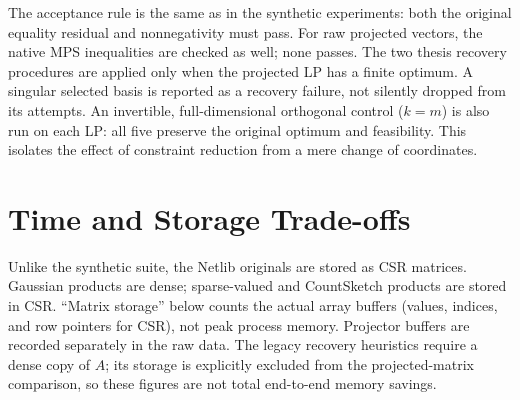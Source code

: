 \documentclass[12pt,letterpaper,oneside]{report}
\theoremstyle{definition}
\begin{document}
The acceptance rule is the same as in the synthetic experiments: both
the original equality residual and nonnegativity must pass. For raw
projected vectors, the native MPS inequalities are checked as well;
none passes. The two thesis recovery procedures are applied only when
the projected LP has a finite optimum. A singular selected basis is
reported as a recovery failure, not silently dropped from its attempts.
An invertible, full-dimensional orthogonal control ($k=m$) is also run
on each LP: all five preserve the original optimum and feasibility.
This isolates the effect of constraint reduction from a mere change of
coordinates.

\section{Time and Storage Trade-offs}
Unlike the synthetic suite, the Netlib originals are stored as CSR
matrices. Gaussian products are dense; sparse-valued and CountSketch
products are stored in CSR. ``Matrix storage'' below counts the actual
array buffers (values, indices, and row pointers for CSR), not peak
process memory. Projector buffers are recorded separately in the raw
data. The legacy recovery heuristics require a dense copy of $A$;
its storage is explicitly excluded from the projected-matrix comparison,
so these figures are not total end-to-end memory savings.
\end{document}
